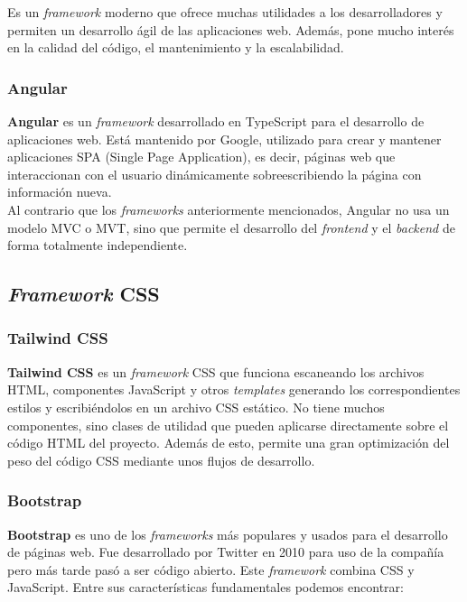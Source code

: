     Es un \textit{framework} moderno que ofrece muchas utilidades a los desarrolladores y
    permiten un desarrollo ágil de las aplicaciones web. Además, pone mucho interés en la
    calidad del código, el mantenimiento y la escalabilidad.

    \subsubsection{Angular}
    \textbf{Angular} \cite{angular} es un \textit{framework} desarrollado en TypeScript para
    el desarrollo de aplicaciones web. Está mantenido por Google, utilizado para crear y
    mantener aplicaciones SPA (Single Page Application), es decir, páginas web que
    interaccionan con el usuario dinámicamente sobreescribiendo la página con información
    nueva.\\

    Al contrario que los \textit{frameworks} anteriormente mencionados, Angular no usa un
    modelo MVC o MVT, sino que permite el desarrollo del \textit{frontend} y el \textit{backend}
    de forma totalmente independiente.

\subsection{\textit{Framework} CSS}

    \subsubsection{Tailwind CSS}
    \textbf{Tailwind CSS} \cite{tailwind-css} es un \textit{framework} CSS que funciona
    escaneando los archivos HTML, componentes JavaScript y otros \textit{templates} generando los
    correspondientes estilos y escribiéndolos en un archivo CSS estático. No tiene muchos
    componentes, sino clases de utilidad que pueden aplicarse directamente sobre el código
    HTML del proyecto. Además de esto, permite una gran optimización del peso del código
    CSS mediante unos flujos de desarrollo.
        
    \subsubsection{Bootstrap}
    \textbf{Bootstrap} \cite{bootstrap} es uno de los \textit{frameworks} más populares y
    usados para el desarrollo de páginas web. Fue desarrollado por Twitter en 2010 para
    uso de la compañía pero más tarde pasó a ser código abierto. Este \textit{framework}
    combina CSS y JavaScript. Entre sus características fundamentales podemos encontrar:
    
